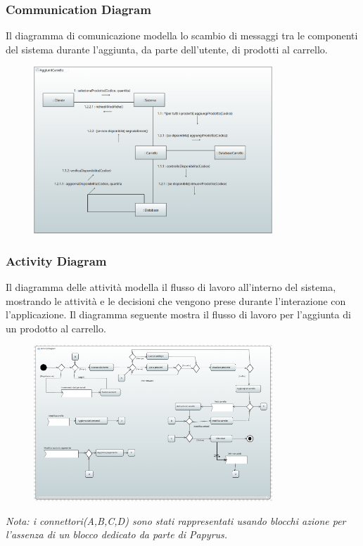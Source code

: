 \documentclass[a4paper,12pt]{article}
\begin{document}
\subsubsection{Communication Diagram}
Il diagramma di comunicazione modella lo scambio di messaggi tra le componenti del sistema durante l'aggiunta, da parte dell'utente, di prodotti al carrello.
\begin{figure}[H]
    \centering
    \includegraphics[width=0.8\textwidth]{../UML/UML png/CommunicationDiagram.png}
    \label{fig:Communication Diagram}
\end{figure}
\subsubsection{Activity Diagram}
Il diagramma delle attività modella il flusso di lavoro all'interno del sistema, mostrando le attività e le decisioni che vengono prese durante l'interazione con l'applicazione.   
Il diagramma seguente mostra il flusso di lavoro per l'aggiunta di un prodotto al carrello.
\begin{figure}[H]
    \centering
    \includegraphics[width=0.8\textwidth]{../UML/UML png/ActivityDiagram.png}
    \label{fig:Activity Diagram}
\end{figure}
\textit{Nota: i connettori(A,B,C,D) sono stati rappresentati usando blocchi azione per l'assenza di un blocco dedicato da parte di Papyrus.}
\end{document}
